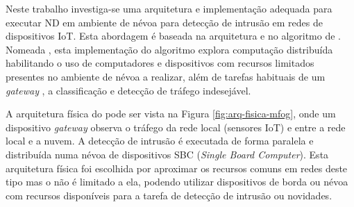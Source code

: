 



Neste trabalho investiga-se uma arquitetura e implementação adequada para
executar \acf{ND} em ambiente de névoa para detecção de intrusão em redes de
dispositivos \acf{IoT}.
Esta abordagem é baseada na arquitetura \arch \cite{Cassales2019a} e no algoritmo
de \nd \minas \cite{Faria2016minas}.
Nomeada \mfog, esta implementação do algoritmo \minas explora computação distribuída
habilitando o uso de computadores e dispositivos com recursos limitados presentes no
ambiente de névoa a realizar, além de tarefas habituais de um \emph{gateway} \iot, a classificação e detecção de
tráfego indesejável.

A arquitetura física do \mfog pode ser vista na Figura
\ref{fig:arq-fisica-mfog}, onde um dispositivo \emph{gateway} observa o tráfego
da rede local (sensores IoT) e entre a rede local e a nuvem.
A detecção de intrusão é executada de forma paralela e distribuída numa névoa de
dispositivos SBC (\emph{Single Board Computer}).
Esta arquitetura física foi escolhida por aproximar os recursos comuns em redes
deste tipo mas o \mfog não é limitado a ela, podendo utilizar dispositivos de
borda ou névoa com recursos disponíveis para a tarefa de detecção de intrusão ou
novidades.

